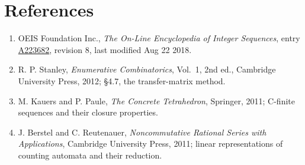 \documentclass[11pt]{article}
\theoremstyle{definition}
\begin{document}
\section{References}

\begin{enumerate}

\item OEIS Foundation Inc., \emph{The On-Line Encyclopedia of Integer Sequences}, entry \href{https://oeis.org/A223682}{A223682}, revision 8, last modified Aug 22 2018.

\item R. P. Stanley, \emph{Enumerative Combinatorics}, Vol.~1, 2nd ed., Cambridge University Press, 2012; \S4.7, the transfer-matrix method.

\item M. Kauers and P. Paule, \emph{The Concrete Tetrahedron}, Springer, 2011; C-finite sequences and their closure properties.

\item J. Berstel and C. Reutenauer, \emph{Noncommutative Rational Series with Applications}, Cambridge University Press, 2011; linear representations of counting automata and their reduction.

\end{enumerate}
\end{document}
